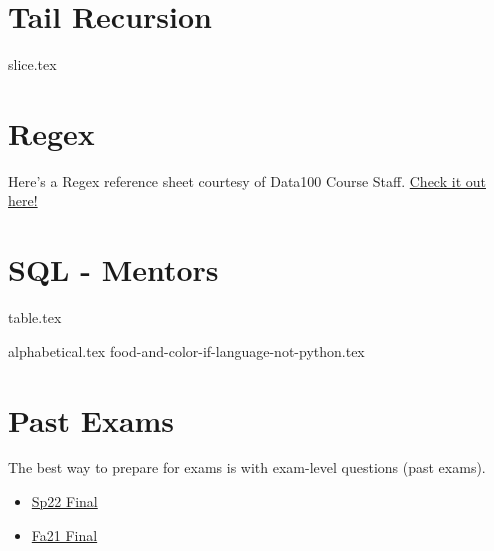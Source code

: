 \documentclass{exam}
\begin{document}
\section{Tail Recursion}
\begin{questions}
{slice.tex}
\end{questions}

\section{Regex}
Here's a Regex reference sheet courtesy of Data100 Course Staff. \href{https://drive.google.com/file/d/1lhIy1fIJZKXeIZYGv4ltkFMwq0OxdKNn/view?usp=sharing}{Check it out here!}

\section{SQL - Mentors}
{table.tex}
\begin{questions}
{alphabetical.tex}
{food-and-color-if-language-not-python.tex}
\end{questions}

\section{Past Exams}
The best way to prepare for exams is with exam-level questions (past exams).
\begin{itemize}
    \item \href{https://cs61a.org/exam/sp22/final/61a-sp22-final.pdf}{Sp22 Final}
    \item \href{https://cs61a.org/exam/fa21/final/61a-fa21-final.pdf}{Fa21 Final}
\end{itemize}
\end{document}
